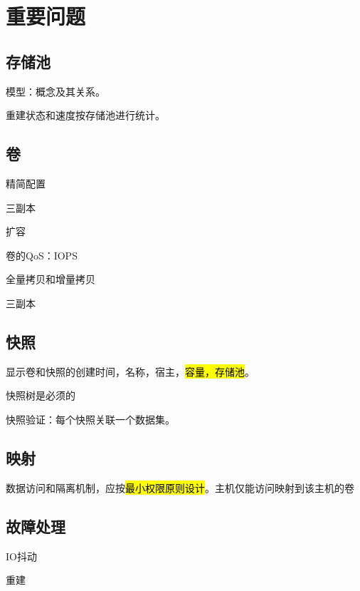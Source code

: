 \section{重要问题}

\subsection{存储池}

模型：概念及其关系。

重建状态和速度按存储池进行统计。

\subsection{卷}

\begin{enumbox}
\item 精简配置
\item 三副本
\item 扩容
\item 卷的QoS：IOPS
\item 全量拷贝和增量拷贝
\end{enumbox}

三副本 

\subsection{快照}

\begin{enumbox}
\item 显示卷和快照的创建时间，名称，宿主，\hl{容量，存储池}。
\item 快照树是必须的
\item 快照验证：每个快照关联一个数据集。
\end{enumbox}

\subsection{映射}

数据访问和隔离机制，应按\hl{最小权限原则设计}。主机仅能访问映射到该主机的卷

\subsection{故障处理}

\begin{enumbox}
\item IO抖动
\item 重建
\end{enumbox}

